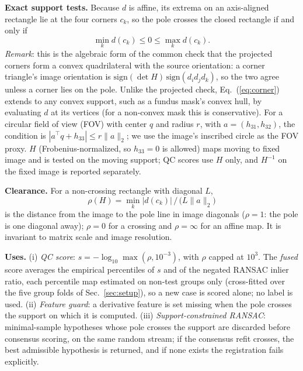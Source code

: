 \documentclass{article}
\begin{document}
\textbf{Exact support tests.} Because $d$ is affine, its extrema on an
axis-aligned rectangle lie at the four corners $c_k$, so the pole crosses the
closed rectangle if and only if
\begin{equation}
\min_k d(c_k)\le0\le\max_k d(c_k).
\label{eq:corner}
\end{equation}
\emph{Remark}: this is the algebraic form of the common check that the projected corners
form a convex quadrilateral with the source orientation: a corner triangle's
image orientation is $\mathrm{sign}(\det H)\,\mathrm{sign}(d_id_jd_k)$, so
the two agree unless a corner lies on the pole. Unlike the projected check,
Eq.~(\ref{eq:corner}) extends to any convex support, such as a fundus mask's
convex hull, by evaluating $d$ at its vertices (for a non-convex mask this is
conservative). For a circular field of view (FOV) with center $q$ and radius $r$, with
$a=(h_{31},h_{32})$, the condition is $|a^\top q+h_{33}|\le r\lVert
a\rVert_2$; we use the image's inscribed circle as the FOV proxy. $H$
(Frobenius-normalized, so $h_{33}=0$ is allowed) maps moving to fixed image
and is tested on the moving support; QC scores use $H$ only, and $H^{-1}$ on
the fixed image is reported separately.

\textbf{Clearance.} For a non-crossing rectangle with diagonal $L$,
\begin{equation}
\rho(H)=\min_k|d(c_k)|\,/\,\bigl(L\lVert a\rVert_2\bigr)
\label{eq:clearance}
\end{equation}
is the distance from the image to the pole line in image diagonals ($\rho=1$:
the pole is one diagonal away); $\rho=0$ for a crossing and $\rho=\infty$ for
an affine map. It is invariant to matrix scale and image resolution.

\textbf{Uses.} (i) \emph{QC score}: $s=-\log_{10}\max(\rho,10^{-3})$, with
$\rho$ capped at $10^{3}$. The \emph{fused} score averages the empirical
percentiles of $s$ and of the negated RANSAC inlier ratio, each percentile
map estimated on non-test groups only (cross-fitted over the five group folds
of Sec.~\ref{sec:setup}), so a new case is scored alone; no label is used. (ii) \emph{Feature guard}: a derivative feature is set missing when
the pole crosses the support on which it is computed. (iii)
\emph{Support-constrained RANSAC}: minimal-sample hypotheses whose pole
crosses the support are discarded before consensus scoring, on the same
random stream; if the consensus refit crosses, the best admissible hypothesis
is returned, and if none exists the registration fails explicitly.
\end{document}
